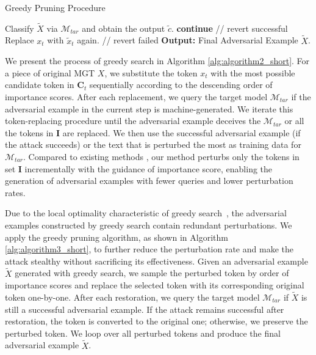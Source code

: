 \begin{algorithm}[t]
\small
\caption{Greedy Pruning Procedure}
\label{alg:algorithm3_short}
\begin{algorithmic}[1]
        \State Classify $\tilde{X}$ via $\mathcal{M}_{tar}$ and obtain the output $\tilde{c}$. 
            \State \textbf{continue} \quad // revert successful
        \Else
            \State Replace $x_t$ with $\tilde{x}_t$ again. \quad // revert failed
        \EndIf
    \EndFor
    \State \textbf{Output:} Final Adversarial Example $\tilde{X}$.
\end{algorithmic}
\end{algorithm}
 We present the process of greedy search in Algorithm \ref{alg:algorithm2_short}. 
For a piece of original MGT $X$, we substitute the token $x_t$ with the most possible candidate token in $\mathbf{C}_t$ sequentially according to the descending order of importance scores. 
After each replacement, we query the target model $\mathcal{M}_{tar}$ if the adversarial example in the current step is machine-generated.
We iterate this token-replacing procedure until the adversarial example deceives the $\mathcal{M}_{tar}$ or all the tokens in $\mathbf{I}$ are replaced. 
We then use the successful adversarial example (if the attack succeeds) or the text that is perturbed the most as training data for $\mathcal{M}_{tar}$.
Compared to existing methods \cite{liu2024hqa,yu2024query,hu2024fasttextdodger}, our method perturbs only the tokens in set $\mathbf{I}$ incrementally with the guidance of importance score, enabling the generation of adversarial examples with fewer queries and lower perturbation rates. 



Due to the local optimality characteristic of greedy search~\cite{yu2024query, prim1957shortest}, the adversarial examples constructed by greedy search contain redundant perturbations. 
We apply the greedy pruning algorithm, as shown in Algorithm \ref{alg:algorithm3_short}, to further reduce the perturbation rate and make the attack stealthy without sacrificing its effectiveness.
Given an adversarial example $\tilde{X}$ generated with greedy search, we sample the perturbed token by order of importance scores and replace the selected token with its corresponding original token one-by-one.
After each restoration, we query the target model $\mathcal{M}_{tar}$ if $\tilde{X}$ is still a successful adversarial example.
If the attack remains successful after restoration,
the token is converted to the original one; otherwise,
we preserve the perturbed token.
We loop over all perturbed tokens and produce the final adversarial example
$\tilde{X}$.

